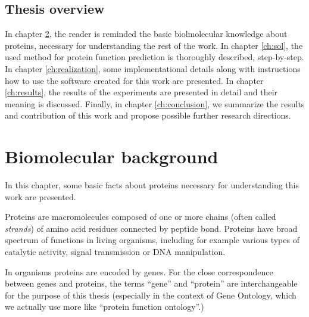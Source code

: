 \documentclass[11pt,twoside,a4paper]{book}
\begin{document}
\section{Thesis overview}
In chapter \ref{ch:molec}, the reader is reminded the basic biolmolecular knowledge about proteins,
necessary for understanding the rest of the work.
In chapter \ref{ch:sol}, the used method for protein function prediction
is thoroughly described, step-by-step.
In chapter \ref{ch:realization}, some implementational details
along with instructions how to use the software created 
for this work are presented.
In chapter \ref{ch:results}, the results of the experiments
are presented in detail and their meaning is discussed.
Finally, in chapter \ref{ch:conclusion}, we summarize the 
results and contribution of this work and propose possible further research directions.



\chapter{Biomolecular background}
\label{ch:molec}
In this chapter, some basic facts about proteins
necessary for understanding this work are presented.

Proteins are macromolecules composed of one or more chains (often called \emph{strands}) of amino acid residues
connected by peptide bond.
Proteins have broad spectrum of functions in living organisms, including for example 
various types of catalytic activity, signal transmission or DNA manipulation.

In organisms proteins are encoded by genes. 
For the close correspondence between genes and proteins,
the terms ``gene'' and ``protein'' are interchangeable for the purpose of this thesis
(especially in the context of Gene Ontology, which we actually use more like ``protein function ontology''.)

\end{document}
